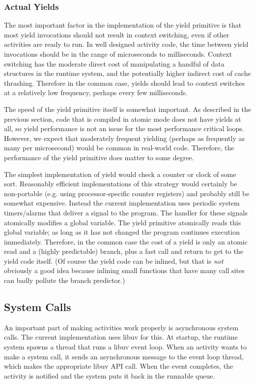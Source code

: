 \documentclass[acmsmall,anonymous,review]{acmart}\settopmatter{printfolios=true,printccs=false,printacmref=false}
\begin{document}
\subsubsection{Actual Yields}

The most important factor in the implementation of the yield primitive is that most yield invocations should not result in context switching, even if other activities are ready to run.
In well designed activity code, the time between yield invocations should be in the range of microseconds to milliseconds.
Context switching has the moderate direct cost of manipulating a handful of data structures in the runtime system, and the potentially higher indirect cost of cache thrashing.
Therefore in the common case, yields should lead to context switches at a relatively low frequency, perhaps every few milliseconds.

The speed of the yield primitive itself is somewhat important.
As described in the previous section, code that is compiled in atomic mode does not have yields at all, so yield performance is not an issue for the most performance critical loops.
However, we expect that moderately frequent yielding (perhaps as frequently as many per microsecond) would be common in real-world code.
Therefore, the performance of the yield primitive does matter to some degree.

The simplest implementation of yield would check a counter or clock of some sort.
Reasonably efficient implementations of this strategy would certainly be non-portable (e.g. using processor-specific counter registers) and probably still be somewhat expensive.
Instead the current \charcoal{} implementation uses periodic system timers/alarms that deliver a signal to the program.
The handler for these signals atomically modifies a global variable.
The yield primitive atomically reads this global variable; as long as it has not changed the program continues execution immediately.
Therefore, in the common case the cost of a yield is only an atomic read and a (highly predictable) branch, plus a fast call and return to get to the yield code itself.
(Of course the yield code can be inlined, but that is \emph{not} obviously a good idea because inlining small functions that have many call sites can badly pollute the branch predictor.)

\subsection{System Calls}

An important part of making activities work properly is asynchronous system calls.
The current \charcoal{} implementation uses libuv for this.
At startup, the runtime system spawns a thread that runs a libuv event loop.
When an activity wants to make a system call, it sends an asynchronous message to the event loop thread, which makes the appropriate libuv API call.
When the event completes, the activity is notified and the system puts it back in the runnable queue.
\end{document}
